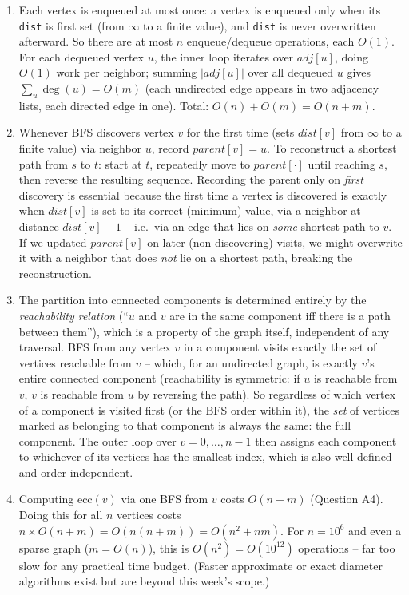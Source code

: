 \documentclass[11pt]{article}
\begin{document}
\begin{enumerate}[label=\textbf{A\arabic*.}, leftmargin=2.2em]
\item Each vertex is enqueued at most once: a vertex is enqueued only when its
\texttt{dist} is first set (from $\infty$ to a finite value), and \texttt{dist} is never
overwritten afterward. So there are at most $n$ enqueue/dequeue operations, each $O(1)$.
For each dequeued vertex $u$, the inner loop iterates over $adj[u]$, doing $O(1)$ work per
neighbor; summing $|adj[u]|$ over all dequeued $u$ gives $\sum_u \deg(u) = O(m)$ (each
undirected edge appears in two adjacency lists, each directed edge in one). Total:
$O(n) + O(m) = O(n+m)$.

\item Whenever BFS discovers vertex $v$ for the first time (sets $dist[v]$ from $\infty$
to a finite value) via neighbor $u$, record $parent[v] = u$. To reconstruct a shortest
path from $s$ to $t$: start at $t$, repeatedly move to $parent[\cdot]$ until reaching $s$,
then reverse the resulting sequence. Recording the parent only on \emph{first}
discovery is essential because the first time a vertex is discovered is exactly when
$dist[v]$ is set to its correct (minimum) value, via a neighbor at distance $dist[v]-1$ --
i.e.\ via an edge that lies on \emph{some} shortest path to $v$. If we updated
$parent[v]$ on later (non-discovering) visits, we might overwrite it with a neighbor that
does \emph{not} lie on a shortest path, breaking the reconstruction.

\item The partition into connected components is determined entirely by the
\emph{reachability relation} (``$u$ and $v$ are in the same component iff there is a path
between them''), which is a property of the graph itself, independent of any traversal.
BFS from any vertex $v$ in a component visits exactly the set of vertices reachable from
$v$ -- which, for an undirected graph, is exactly $v$'s entire connected component
(reachability is symmetric: if $u$ is reachable from $v$, $v$ is reachable from $u$ by
reversing the path). So regardless of which vertex of a component is visited first (or
the BFS order within it), the \emph{set} of vertices marked as belonging to that component
is always the same: the full component. The outer loop over $v=0,\dots,n-1$ then assigns
each component to whichever of its vertices has the smallest index, which is also
well-defined and order-independent.

\item Computing $\mathrm{ecc}(v)$ via one BFS from $v$ costs $O(n+m)$ (Question A4).
Doing this for all $n$ vertices costs $n \times O(n+m) = O(n(n+m)) = O(n^2 + nm)$. For
$n = 10^6$ and even a sparse graph ($m = O(n)$), this is $O(n^2) = O(10^{12})$ operations
-- far too slow for any practical time budget. (Faster approximate or exact diameter
algorithms exist but are beyond this week's scope.)


\end{enumerate}
\end{document}
